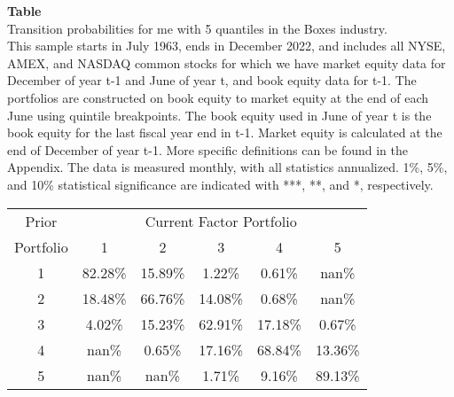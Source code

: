 \begin{table*}[ht!]
\raggedright
{}
\label{tab: transition_probs_me_Boxes_with_5_quantiles}
\textbf{Table \thetable} \\
Transition probabilities for me with 5 quantiles in the Boxes industry. \\
\hspace*{1em}This sample starts in July 1963, ends in December 2022, and includes all NYSE, AMEX, and NASDAQ common stocks for which we have market equity data for December of year t-1 and June of year t, and book equity data for t-1. The portfolios are constructed on book equity to market equity at the end of each June using quintile breakpoints.  The book equity used in June of year t is the book equity for the last fiscal year end in t-1.  Market equity is calculated at the end of December of year t-1.  More specific definitions can be found in the Appendix.  The data is measured monthly, with all statistics annualized.  1\%, 5\%, and 10\% statistical significance are indicated with ***, **, and *, respectively. \\
\vspace{0.5em}
\centering
\begin{adjustbox}{max width=\textwidth}
\begin{tabular}{@{}cccccc@{}}
\toprule
Prior & \multicolumn{5}{c}{Current Factor Portfolio} \\
Portfolio & 1 & 2 & 3 & 4 & 5 \\
\midrule
1 & 82.28\% & 15.89\% & 1.22\% & 0.61\% & nan\% \\
2 & 18.48\% & 66.76\% & 14.08\% & 0.68\% & nan\% \\
3 & 4.02\% & 15.23\% & 62.91\% & 17.18\% & 0.67\% \\
4 & nan\% & 0.65\% & 17.16\% & 68.84\% & 13.36\% \\
5 & nan\% & nan\% & 1.71\% & 9.16\% & 89.13\% \\
\bottomrule
\end{tabular}
\end{adjustbox}
\end{table*}